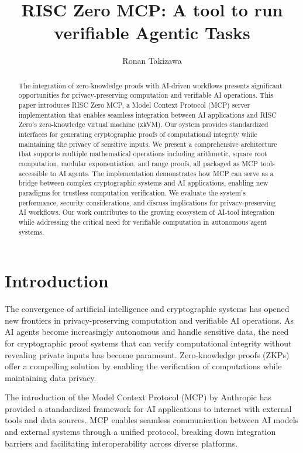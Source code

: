 \documentclass[11pt]{article}
\begin{document}
\title{RISC Zero MCP: A tool to run verifiable Agentic Tasks}

\author{Ronan Takizawa}


\maketitle

\begin{abstract}
The integration of zero-knowledge proofs with AI-driven workflows presents significant opportunities for privacy-preserving computation and verifiable AI operations. This paper introduces RISC Zero MCP, a Model Context Protocol (MCP) server implementation that enables seamless integration between AI applications and RISC Zero's zero-knowledge virtual machine (zkVM). Our system provides standardized interfaces for generating cryptographic proofs of computational integrity while maintaining the privacy of sensitive inputs. We present a comprehensive architecture that supports multiple mathematical operations including arithmetic, square root computation, modular exponentiation, and range proofs, all packaged as MCP tools accessible to AI agents. The implementation demonstrates how MCP can serve as a bridge between complex cryptographic systems and AI applications, enabling new paradigms for trustless computation verification. We evaluate the system's performance, security considerations, and discuss implications for privacy-preserving AI workflows. Our work contributes to the growing ecosystem of AI-tool integration while addressing the critical need for verifiable computation in autonomous agent systems.
\end{abstract}

\section{Introduction}

The convergence of artificial intelligence and cryptographic systems has opened new frontiers in privacy-preserving computation and verifiable AI operations. As AI agents become increasingly autonomous and handle sensitive data, the need for cryptographic proof systems that can verify computational integrity without revealing private inputs has become paramount. Zero-knowledge proofs (ZKPs) offer a compelling solution by enabling the verification of computations while maintaining data privacy.

The introduction of the Model Context Protocol (MCP) by Anthropic has provided a standardized framework for AI applications to interact with external tools and data sources. MCP enables seamless communication between AI models and external systems through a unified protocol, breaking down integration barriers and facilitating interoperability across diverse platforms.
\end{document}

